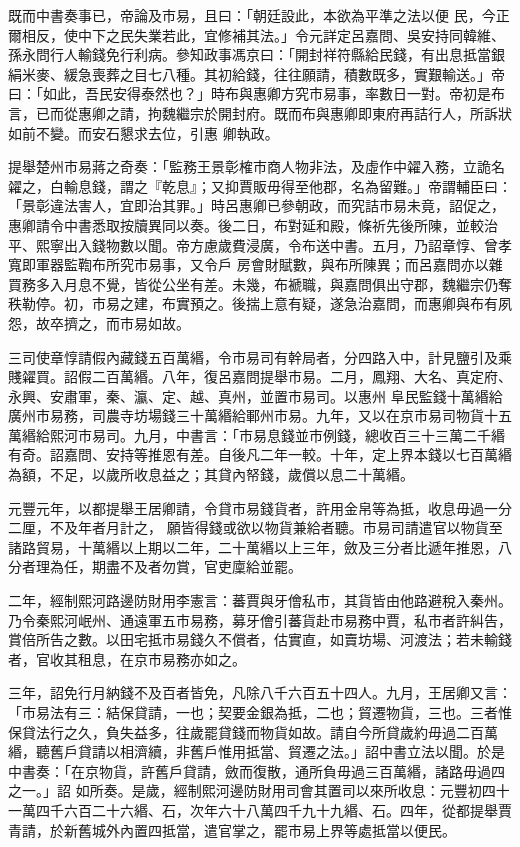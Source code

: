 \begin{pinyinscope}
 既而中書奏事已，帝論及市易，且曰：「朝廷設此，本欲為平準之法以便
 民，今正爾相反，使中下之民失業若此，宜修補其法。」令元詳定呂嘉問、吳安持同韓維、孫永問行人輸錢免行利病。參知政事馮京曰：「開封祥符縣給民錢，有出息抵當銀絹米麥、緩急喪葬之目七八種。其初給錢，往往願請，積數既多，實艱輸送。」帝曰：「如此，吾民安得泰然也？」時布與惠卿方究市易事，率數日一對。帝初是布言，已而從惠卿之請，拘魏繼宗於開封府。既而布與惠卿即東府再詰行人，所訴狀如前不變。而安石懇求去位，引惠
 卿執政。



 提舉楚州市易蔣之奇奏：「監務王景彰榷市商人物非法，及虛作中糴入務，立詭名糴之，白輸息錢，謂之『乾息』；又抑賈販毋得至他郡，名為留難。」帝謂輔臣曰：「景彰違法害人，宜即治其罪。」時呂惠卿已參朝政，而究詰市易未竟，詔促之，惠卿請令中書悉取按牘異同以奏。後二日，布對延和殿，條祈先後所陳，並較治平、熙寧出入錢物數以聞。帝方慮歲費浸廣，令布送中書。五月，乃詔章惇、曾孝寬即軍器監鞫布所究市易事，又令戶
 房會財賦數，與布所陳異；而呂嘉問亦以雜買務多入月息不覺，皆從公坐有差。未幾，布褫職，與嘉問俱出守郡，魏繼宗仍奪秩勒停。初，市易之建，布實預之。後揣上意有疑，遂急治嘉問，而惠卿與布有夙怨，故卒擠之，而市易如故。



 三司使章惇請假內藏錢五百萬緡，令市易司有幹局者，分四路入中，計見鹽引及乘賤糴買。詔假二百萬緡。八年，復呂嘉問提舉市易。二月，鳳翔、大名、真定府、永興、安肅軍，秦、瀛、定、越、真州，並置市易司。以惠州
 阜民監錢十萬緡給廣州市易務，司農寺坊場錢三十萬緡給鄆州市易。九年，又以在京市易司物貨十五萬緡給熙河市易司。九月，中書言：「市易息錢並市例錢，總收百三十三萬二千緡有奇。詔嘉問、安持等推恩有差。自後凡二年一較。十年，定上界本錢以七百萬緡為額，不足，以歲所收息益之；其貸內帑錢，歲償以息二十萬緡。



 元豐元年，以都提舉王居卿請，令貸市易錢貨者，許用金帛等為抵，收息毋過一分二厘，不及年者月計之，
 願皆得錢或欲以物貨兼給者聽。市易司請遣官以物貨至諸路貿易，十萬緡以上期以二年，二十萬緡以上三年，斂及三分者比遞年推恩，八分者理為任，期盡不及者勿賞，官吏廩給並罷。



 二年，經制熙河路邊防財用李憲言：蕃賈與牙儈私市，其貨皆由他路避稅入秦州。乃令秦熙河岷州、通遠軍五市易務，募牙儈引蕃貨赴市易務中賈，私市者許糾告，賞倍所告之數。以田宅抵市易錢久不償者，估實直，如賣坊場、河渡法；若未輸錢
 者，官收其租息，在京市易務亦如之。



 三年，詔免行月納錢不及百者皆免，凡除八千六百五十四人。九月，王居卿又言：「市易法有三：結保貸請，一也；契要金銀為抵，二也；貿遷物貨，三也。三者惟保貸法行之久，負失益多，往歲罷貸錢而物貨如故。請自今所貸歲約毋過二百萬緡，聽舊戶貸請以相濟續，非舊戶惟用抵當、貿遷之法。」詔中書立法以聞。於是中書奏：「在京物貨，許舊戶貸請，斂而復散，通所負毋過三百萬緡，諸路毋過四之一。」詔
 如所奏。是歲，經制熙河邊防財用司會其置司以來所收息：元豐初四十一萬四千六百二十六緡、石，次年六十八萬四千九十九緡、石。四年，從都提舉賈青請，於新舊城外內置四抵當，遣官掌之，罷市易上界等處抵當以便民。




\end{pinyinscope}
